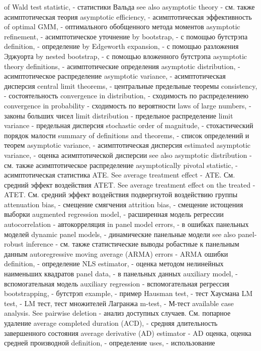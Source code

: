 of Wald test statistic, - статистики Вальда
see also asymptotic theory - см. также асимптотическая теория
asymptotic efficiency, - асимптотическая эффективность
of optimal GMM, - оптимального обобщенного метода моментов
asymptotic refinement, - асимптотическое уточнение
by bootstrap, - с помощью бутстрэпа 
definition, - определение
by Edgeworth expansion, - с помощью разложения Эджуорта
by nested bootstrap, - с помощью вложенного бутстрэпа
asymptotic theory definitions, - асимптотические определения
asymptotic distribution, - асимптотическое распределение 
asymptotic variance, - асимптотическая дисперсия
central limit theorems, - центральные предельные теоремы 
consistency, - состоятельность
convergence in distribution, - сходимость по распределениею 
convergence in probability - сходимость по вероятности
laws of large numbers, - законы больших чисел 
limit distribution - предельное распределение
limit variance - предельная дисперсия
stochastic order of magnitude, - стохастический порядок малости 
summary of definitions and theorems, - список определений и теорем
asymptotic variance, - асимптотическая дисперсия 
estimated asymptotic variance,  - оценка асимптотической дисперсии
see also asymptotic distribution - см. также асимптотическое распределение
asymptotically pivotal statistic, - асимптотическая статистика
ATE. See average treatment effect - ATE. См. средний эффект воздействия
ATET. See average treatment effect on the treated - ATET. См. средний эффект воздействия подвергнутой воздействию группы
attenuation bias, - смещение смягчения 
attrition bias, - смещение истощения выборки
augmented regression model, - расширенная модель регрессии
autocorrelation - автокорреляция
in panel model errors, - в ошибках панельных моделей 
dynamic panel models, - динамические панельные модели
see also panel-robust inference - см. также статистические выводы робастные к панельным данным
autoregressive moving average (ARMA) errors - ARMA ошибки
definition, - определение
NLS estimator, - оценка методом нелинейных наименьших квадратов
panel data, - в панельных данных
auxiliary model, - вспомогательная модель 
auxiliary regression - вспомогательная регрессия 
bootstrapping, - бутстрэп 
example, - пример 
Hausman test, - тест Хаусмана
LM test, - LM тест, тест множителей Лагранжа
m-test, - М-тест
available case analysis. See pairwise deletion - анализ доступных случаев. См. попарное удаление
average completed duration (ACD), - средняя длительность завершенного состояния 
average derivative (AD) estimator - AD оценка, оценка средней производной
definition, - определение
uses, - использование
